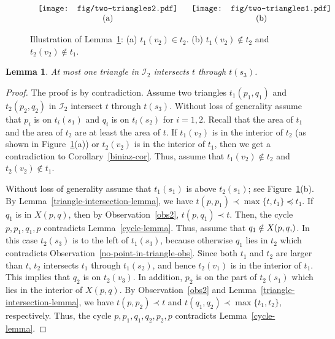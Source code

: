 \documentclass[11pt,a4paper]{article}
\newcommand{\trmin}{t}
\newcommand{\hex}[2]{X(#1,#2)}
\newcommand{\tra}[2]{{#1}({#2})}
\newtheorem{lemma}{Lemma}
\begin{document}
\begin{figure}[htb]
  \centering
\setlength{\tabcolsep}{0in}
  $\begin{tabular}{cc}
\multicolumn{1}{m{.5\columnwidth}}{\centering\texttt{[image: fig/two-triangles2.pdf]}}
&\multicolumn{1}{m{.5\columnwidth}}{\centering\texttt{[image: fig/two-triangles1.pdf]}} \\
(a) & (b)
\end{tabular}$
  \caption{Illustration of Lemma~\ref{side-intersection}: (a) $t_1(v_2)\in t_2$. (b) $t_1(v_2)\notin t_2$ and $t_2(v_2)\notin t_1$.}
  \label{two-triangles-fig}
\end{figure}

\begin{lemma}
\label{side-intersection}
At most one triangle in $\mathcal{I}_2$ intersects $\trmin$ through $\tra{\trmin}{s_3}$.
\end{lemma}
\begin{proof}
The proof is by contradiction. Assume two triangles $t_1(p_1,q_1)$ and $t_2(p_2,q_2)$ in $\mathcal{I}_2$ intersect $\trmin$ through $\tra{\trmin}{s_3}$. Without loss of generality assume that $p_i$ is on $t_i(s_1)$ and $q_i$ is on $t_i(s_2)$ for $i=1,2$. Recall that the area of $t_1$ and the area of $t_2$ are at least the area of $\trmin$. If $\tra{t_1}{v_2}$ is in the interior of $t_2$ (as shown in Figure~\ref{two-triangles-fig}(a)) or $\tra{t_2}{v_2}$ is in the interior of $t_1$, then we get a contradiction to Corollary~\ref{biniaz-cor}. Thus, assume that $\tra{t_1}{v_2}\notin t_2$ and $\tra{t_2}{v_2} \notin t_1$. 

Without loss of generality assume that $\tra{t_1}{s_1}$ is above $\tra{t_2}{s_1}$; see Figure~\ref{two-triangles-fig}(b). By Lemma~\ref{triangle-intersection-lemma}, we have $t(p,p_1)\prec \max\{t,t_1\}\preceq t_1$. If $q_1$ is in $\hex{p}{q}$, then by Observation~\ref{obs2}, $t(p,q_1)\prec t$. Then, the cycle $p,p_1,q_1,p$ contradicts Lemma~\ref{cycle-lemma}. Thus, assume that $q_1\notin \hex{p,q}$. In this case $\tra{t_2}{s_3}$ is to the left of $\tra{t_1}{s_3}$, because otherwise $q_1$ lies in $t_2$ which contradicts Observation~\ref{no-point-in-triangle-obs}.
Since both $t_1$ and $t_2$ are larger than $t$, $t_2$ intersects $t_1$ through $t_1(s_2)$, and hence $\tra{t_2}{v_1}$ is in the interior of $t_1$. This implies that $q_2$ is on $\tra{t_2}{v_3}$. In addition, $p_2$ is on the part of $\tra{t_2}{s_1}$ which lies in the interior of $\hex{p}{q}$. By Observation~\ref{obs2} and Lemma~\ref{triangle-intersection-lemma}, we have $t(p,p_2)\prec t$ and $t(q_1,q_2)\prec \max\{t_1,t_2\}$, respectively. Thus, the cycle $p,p_1,q_1,q_2,p_2,p$ contradicts Lemma~\ref{cycle-lemma}. 
\end{proof}
\end{document}
